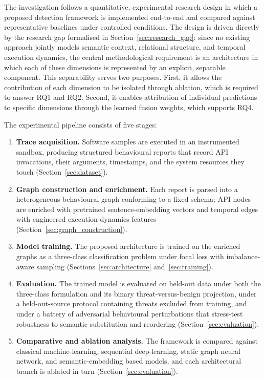 \documentclass[%
    BCOR=10mm,
    DIV=13,
    toc=bibliography,
    toc=listof,
    oneside,
    12pt,
]{scrbook}
\begin{document}
The investigation follows a quantitative, experimental research design in
which a proposed detection framework is implemented end-to-end and compared
against representative baselines under controlled conditions. The design is
driven directly by the research gap formalised in
Section~\ref{sec:research_gap}: since no existing approach jointly models
semantic context, relational structure, and temporal execution dynamics, the
central methodological requirement is an architecture in which each of these
dimensions is represented by an explicit, separable component. This
separability serves two purposes. First, it allows the contribution of each
dimension to be isolated through ablation, which is required to answer RQ1 and
RQ2. Second, it enables attribution of individual predictions to specific
dimensions through the learned fusion weights, which supports RQ4.

The experimental pipeline consists of five stages:

\begin{enumerate}[leftmargin=*]
  \item \textbf{Trace acquisition.} Software samples are executed in an
        instrumented sandbox, producing structured behavioural reports that
        record API invocations, their arguments, timestamps, and the system
        resources they touch (Section~\ref{sec:dataset}).
  \item \textbf{Graph construction and enrichment.} Each report is parsed into
        a heterogeneous behavioural graph conforming to a fixed schema; API
        nodes are enriched with pretrained sentence-embedding vectors and
        temporal edges with engineered execution-dynamics features
        (Section~\ref{sec:graph_construction}).
  \item \textbf{Model training.} The proposed architecture is trained on the
        enriched graphs as a three-class classification problem under focal
        loss with imbalance-aware sampling (Sections~\ref{sec:architecture}
        and~\ref{sec:training}).
  \item \textbf{Evaluation.} The trained model is evaluated on held-out data
        under both the three-class formulation and its binary
        threat-versus-benign projection, under a held-out-source protocol
        containing threats excluded from training, and under a battery
        of adversarial behavioural perturbations that stress-test robustness to
        semantic substitution and reordering (Section~\ref{sec:evaluation}).
  \item \textbf{Comparative and ablation analysis.} The framework is compared
        against classical machine-learning, sequential deep-learning, static
        graph neural network, and semantic-embedding based models, and each architectural
        branch is ablated in turn (Section~\ref{sec:evaluation}).
\end{enumerate}
\end{document}
